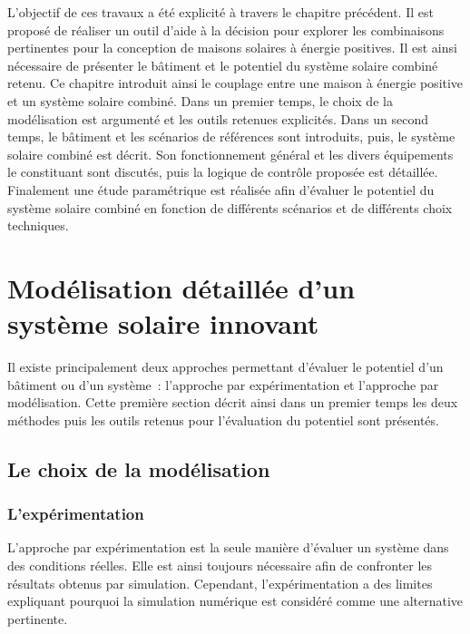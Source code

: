 

L’objectif de ces travaux a été explicité à travers le chapitre précédent. Il est proposé
de réaliser un outil d’aide à la décision pour explorer les combinaisons pertinentes pour
la conception de maisons solaires à énergie positives. Il est ainsi nécessaire de
présenter le bâtiment et le potentiel du système solaire combiné retenu. Ce chapitre
introduit ainsi le couplage entre une maison à énergie positive et un système solaire
combiné. Dans un premier temps, le choix de la modélisation est argumenté et les outils
retenues explicités. Dans un second temps, le bâtiment et les scénarios de références sont
introduits, puis, le système solaire combiné est décrit. Son fonctionnement général et les
divers équipements le constituant sont discutés, puis la logique de contrôle proposée est
détaillée. Finalement une étude paramétrique est réalisée afin d’évaluer le potentiel du
système solaire combiné en fonction de différents scénarios et de différents choix
techniques.
\clearpage


\section{Modélisation détaillée d’un système solaire innovant} %
\label{sec:modelisation_detaillee_d_un_systeme_solaire_innovant}
Il existe principalement deux approches permettant d’évaluer le potentiel d’un bâtiment ou
d’un système~: l’approche par expérimentation et l’approche par modélisation. Cette
première section décrit ainsi dans un premier temps les deux méthodes puis les outils
retenus pour l’évaluation du potentiel sont présentés.

\subsection{Le choix de la modélisation} %
\label{sub:le_choix_de_la_modelisation}
\subsubsection{L’expérimentation} %
\label{ssub:l_experimentation}
L’approche par expérimentation est la seule manière d’évaluer un système dans des
conditions réelles. Elle est ainsi toujours nécessaire afin de confronter les résultats
obtenus par simulation. Cependant, l’expérimentation a des limites expliquant
pourquoi la simulation numérique est considéré comme une alternative pertinente.

